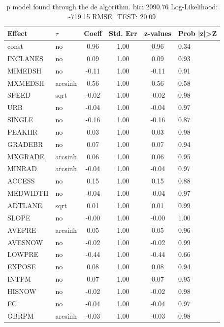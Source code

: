 \begin{table}
	\caption{p model found through the de algorithm. bic: 2090.76 Log-Likelihood: -719.15 RMSE_TEST: 20.09}
	\begin{center}
		\begin{tabular}{|l|l|c|c|c|l|}
			\hline
			Effect & $\tau$ & Coeff & Std. Err & z-values & Prob |z|>Z \\
			\hline
			const & no & 0.96 & 1.00 & 0.96 & 0.34 \\
			\hline
			INCLANES & no & 0.09 & 1.00 & 0.09 & 0.93 \\
			\hline
			MIMEDSH & no & -0.11 & 1.00 & -0.11 & 0.91 \\
			\hline
			MXMEDSH & arcsinh & 0.56 & 1.00 & 0.56 & 0.58 \\
			\hline
			SPEED & sqrt & -0.02 & 1.00 & -0.02 & 0.98 \\
			\hline
			URB & no & -0.04 & 1.00 & -0.04 & 0.97 \\
			\hline
			SINGLE & no & -0.16 & 1.00 & -0.16 & 0.87 \\
			\hline
			PEAKHR & no & 0.03 & 1.00 & 0.03 & 0.98 \\
			\hline
			GRADEBR & no & 0.07 & 1.00 & 0.07 & 0.94 \\
			\hline
			MXGRADE & arcsinh & 0.06 & 1.00 & 0.06 & 0.95 \\
			\hline
			MINRAD & arcsinh & -0.04 & 1.00 & -0.04 & 0.97 \\
			\hline
			ACCESS & no & 0.15 & 1.00 & 0.15 & 0.88 \\
			\hline
			MEDWIDTH & no & -0.04 & 1.00 & -0.04 & 0.97 \\
			\hline
			ADTLANE & sqrt & 0.01 & 1.00 & 0.01 & 0.99 \\
			\hline
			SLOPE & no & -0.00 & 1.00 & -0.00 & 1.00 \\
			\hline
			AVEPRE & arcsinh & 0.05 & 1.00 & 0.05 & 0.96 \\
			\hline
			AVESNOW & no & -0.02 & 1.00 & -0.02 & 0.99 \\
			\hline
			LOWPRE & no & -0.44 & 1.00 & -0.44 & 0.66 \\
			\hline
			EXPOSE & no & 0.08 & 1.00 & 0.08 & 0.94 \\
			\hline
			INTPM & no & 0.07 & 1.00 & 0.07 & 0.95 \\
			\hline
			HISNOW & no & -0.02 & 1.00 & -0.02 & 0.98 \\
			\hline
			FC & no & -0.04 & 1.00 & -0.04 & 0.97 \\
			\hline
			GBRPM & arcsinh & -0.03 & 1.00 & -0.03 & 0.98 \\

\end{tabular}
\end{center}
\end{table}
